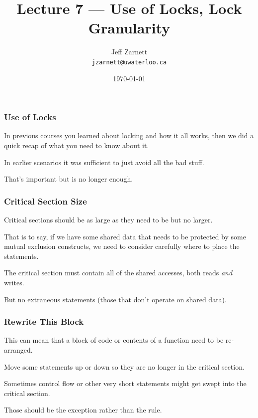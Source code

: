 
\usepackage{multirow}

\title{Lecture 7 --- Use of Locks, Lock Granularity }

\author{Jeff Zarnett \\ \small \texttt{jzarnett@uwaterloo.ca}}
\date{\today}




\begin{frame}
  \titlepage

 \end{frame}




\begin{frame}
\frametitle{Use of Locks}

In previous courses you learned about locking and how it all works, then we did a quick recap of what you need to know about it.

In earlier scenarios it was sufficient to just avoid all the bad stuff.

That's important but is no longer enough.

\end{frame}


\begin{frame}
\frametitle{Critical Section Size}

Critical sections should be as large as they need to be but no larger. 

That is to say, if we have some shared data that needs to be protected by some mutual exclusion constructs, we need to consider carefully where to place the statements. 

The critical section must contain all of the shared accesses, both reads \textit{and} writes.

But no extraneous statements (those that don't operate on shared data).
\end{frame}


\begin{frame}
\frametitle{Rewrite This Block}

This can mean that a block of code or contents of a function need to be re-arranged.

Move some statements up or down so they are no longer in the critical section. 

Sometimes control flow or other very short statements might get swept into the critical section.

Those should be the exception rather than the rule.


\end{frame}


